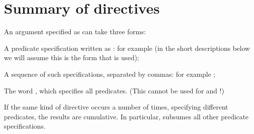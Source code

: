 \chapter*{Summary of directives\label{directives}}%


An argument specified as  can take three forms:
\begin{LightEnumerate}
\item
  A predicate specification written as : for example
   (in the short descriptions below we will assume this is the form
  that is used);
\item
  A sequence of such specifications, separated by commas: for example
  ;
\item
  The word , which specifies all predicates. (This cannot be used
  for  and !)
\end{LightEnumerate}
If the same kind of directive occurs a number of times, specifying different
predicates, the results are cumulative.  In particular,  subsumes all
other predicate specifications.

